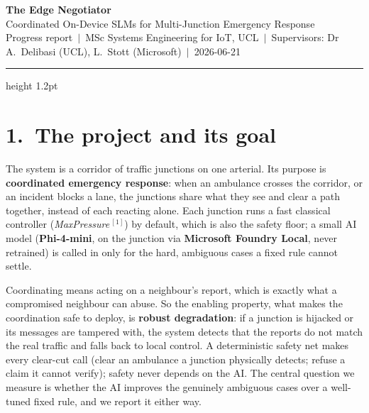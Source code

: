 \documentclass[11pt]{article}
\begin{document}
\begin{center}
{\sffamily\bfseries\LARGE\color{nbblue} The Edge Negotiator}\\[3pt]
{\sffamily\large Coordinated On-Device SLMs for Multi-Junction Emergency Response}\\[5pt]
{\footnotesize\color{nbgrey} Progress report \,$\vert$\, MSc Systems Engineering for IoT, UCL \,$\vert$\, Supervisors: Dr A.\ Delibasi (UCL), L.\ Stott (Microsoft) \,$\vert$\, 2026-06-21}
\end{center}
\vspace{2pt}
{\color{nbblue}\hrule height 1.2pt}
\vspace{8pt}

\section{1.\ The project and its goal}
The system is a corridor of traffic junctions on one arterial. Its purpose is \textbf{coordinated emergency response}: when an ambulance crosses the corridor, or an incident blocks a lane, the junctions share what they see and clear a path together, instead of each reacting alone. Each junction runs a fast classical controller (\emph{MaxPressure}\,$^{[1]}$) by default, which is also the safety floor; a small AI model (\textbf{Phi-4-mini}, on the junction via \textbf{Microsoft Foundry Local}, never retrained) is called in only for the hard, ambiguous cases a fixed rule cannot settle.

Coordinating means acting on a neighbour's report, which is exactly what a compromised neighbour can abuse. So the enabling property, what makes the coordination safe to deploy, is \textbf{robust degradation}: if a junction is hijacked or its messages are tampered with, the system detects that the reports do not match the real traffic and falls back to local control. A deterministic safety net makes every clear-cut call (clear an ambulance a junction physically detects; refuse a claim it cannot verify); safety never depends on the AI. The central question we measure is whether the AI improves the genuinely ambiguous cases over a well-tuned fixed rule, and we report it either way.
\end{document}

